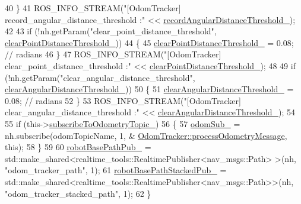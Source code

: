 \begin{DoxyCode}
40     \}
41     ROS\_INFO\_STREAM(\textcolor{stringliteral}{"[OdomTracker] record\_angular\_distance\_threshold :"} << 
      \hyperlink{classcl__move__base__z_1_1odom__tracker_1_1OdomTracker_a1274fe5334c109cd9c2339beb9411441}{recordAngularDistanceThreshold\_});
42 
43     \textcolor{keywordflow}{if} (!nh.getParam(\textcolor{stringliteral}{"clear\_point\_distance\_threshold"}, 
      \hyperlink{classcl__move__base__z_1_1odom__tracker_1_1OdomTracker_a7155d25d0e8dd9f237a79ff503b80e26}{clearPointDistanceThreshold\_}))
44     \{
45         \hyperlink{classcl__move__base__z_1_1odom__tracker_1_1OdomTracker_a7155d25d0e8dd9f237a79ff503b80e26}{clearPointDistanceThreshold\_} = 0.08; \textcolor{comment}{// radians}
46     \}
47     ROS\_INFO\_STREAM(\textcolor{stringliteral}{"[OdomTracker] clear\_point\_distance\_threshold :"} << 
      \hyperlink{classcl__move__base__z_1_1odom__tracker_1_1OdomTracker_a7155d25d0e8dd9f237a79ff503b80e26}{clearPointDistanceThreshold\_});
48 
49     \textcolor{keywordflow}{if} (!nh.getParam(\textcolor{stringliteral}{"clear\_angular\_distance\_threshold"}, 
      \hyperlink{classcl__move__base__z_1_1odom__tracker_1_1OdomTracker_a1b79dd86745adfb31db822e0c8106282}{clearAngularDistanceThreshold\_}))
50     \{
51         \hyperlink{classcl__move__base__z_1_1odom__tracker_1_1OdomTracker_a1b79dd86745adfb31db822e0c8106282}{clearAngularDistanceThreshold\_} = 0.08; \textcolor{comment}{// radians}
52     \}
53     ROS\_INFO\_STREAM(\textcolor{stringliteral}{"[OdomTracker] clear\_angular\_distance\_threshold :"} << 
      \hyperlink{classcl__move__base__z_1_1odom__tracker_1_1OdomTracker_a1b79dd86745adfb31db822e0c8106282}{clearAngularDistanceThreshold\_});
54 
55     \textcolor{keywordflow}{if} (this->\hyperlink{classcl__move__base__z_1_1odom__tracker_1_1OdomTracker_afbe614b53a1493eb8268b8ea65b5b93a}{subscribeToOdometryTopic\_})
56     \{
57         \hyperlink{classcl__move__base__z_1_1odom__tracker_1_1OdomTracker_ab55df0e91246e43dff80912dc35a4fee}{odomSub\_} = nh.subscribe(odomTopicName, 1, &
      \hyperlink{classcl__move__base__z_1_1odom__tracker_1_1OdomTracker_a12c5a839cfde2e8f2f55a5e0c9647b18}{OdomTracker::processOdometryMessage}, \textcolor{keyword}{this});
58     \}
59 
60     \hyperlink{classcl__move__base__z_1_1odom__tracker_1_1OdomTracker_a40a7cbb6bb6595e250e7c685c781613b}{robotBasePathPub\_} = std::make\_shared<realtime\_tools::RealtimePublisher<nav\_msgs::Path>
      >(nh, \textcolor{stringliteral}{"odom\_tracker\_path"}, 1);
61     \hyperlink{classcl__move__base__z_1_1odom__tracker_1_1OdomTracker_a7a2fb23e835ba7d63e69c8db819be876}{robotBasePathStackedPub\_} = 
      std::make\_shared<realtime\_tools::RealtimePublisher<nav\_msgs::Path>>(nh, \textcolor{stringliteral}{"odom\_tracker\_stacked\_path"}, 1);
62 \}
\end{DoxyCode}
